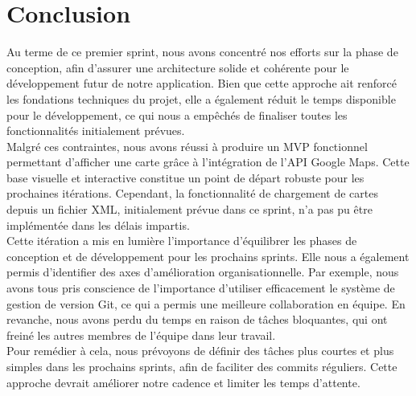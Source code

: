 \documentclass[a4paper]{article}
\begin{document}
\section*{Conclusion}
Au terme de ce premier sprint, nous avons concentré nos efforts sur la phase de conception, afin d’assurer une architecture solide et cohérente pour le développement futur de notre application. Bien que cette approche ait renforcé les fondations techniques du projet, elle a également réduit le temps disponible pour le développement, ce qui nous a empêchés de finaliser toutes les fonctionnalités initialement prévues. \\
\newline
\indent Malgré ces contraintes, nous avons réussi à produire un MVP fonctionnel permettant d’afficher une carte grâce à l’intégration de l’API Google Maps. Cette base visuelle et interactive constitue un point de départ robuste pour les prochaines itérations. Cependant, la fonctionnalité de chargement de cartes depuis un fichier XML, initialement prévue dans ce sprint, n’a pas pu être implémentée dans les délais impartis.\\
\newline
\indent Cette itération a mis en lumière l’importance d’équilibrer les phases de conception et de développement pour les prochains sprints. Elle nous a également permis d’identifier des axes d’amélioration organisationnelle. Par exemple, nous avons tous pris conscience de l’importance d’utiliser efficacement le système de gestion de version Git, ce qui a permis une meilleure collaboration en équipe. En revanche, nous avons perdu du temps en raison de tâches bloquantes, qui ont freiné les autres membres de l’équipe dans leur travail.\\
\newline
\indent Pour remédier à cela, nous prévoyons de définir des tâches plus courtes et plus simples dans les prochains sprints, afin de faciliter  des commits réguliers. Cette approche devrait améliorer notre cadence et limiter les temps d’attente.
\end{document}
